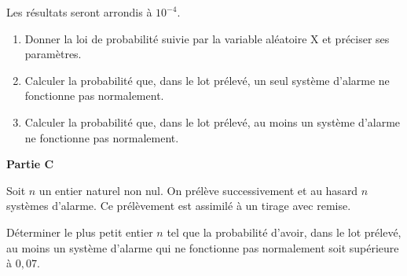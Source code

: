 Les résultats seront arrondis à $10^{-4}$.

\begin{enumerate}
	\item Donner la loi de probabilité suivie par la variable aléatoire X et préciser ses paramètres.
	\item Calculer la probabilité que, dans le lot prélevé, un seul système d'alarme ne fonctionne pas normalement.
	\item Calculer la probabilité que, dans le lot prélevé, au moins un système d'alarme ne fonctionne pas normalement.
\end{enumerate}

\textbf{Partie C}

\medskip

Soit $n$ un entier naturel non nul. On prélève successivement et au hasard $n$ systèmes d'alarme. Ce prélèvement est assimilé à un tirage avec remise.

Déterminer le plus petit entier $n$ tel que la probabilité d'avoir, dans le lot prélevé, au moins un système d'alarme qui ne fonctionne pas normalement soit supérieure à $0,07$.

